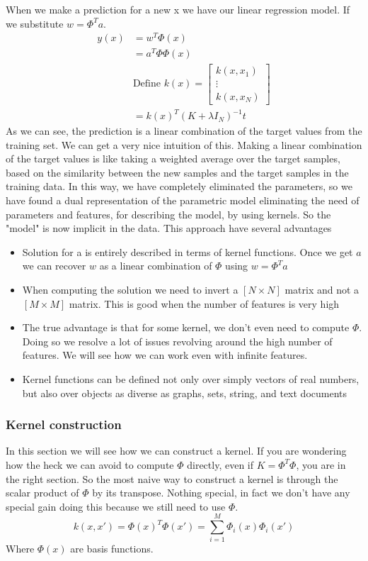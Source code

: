 \documentclass[../main.tex]{subfiles}
\begin{document}
When we make a prediction for a new x we have our linear regression model. If we substitute $w=\Phi^Ta$.
\begin{align*}
    y(x) & = w^T\Phi(x)                      \\
         & = a^T\Phi \Phi(x)                 \\
         & \text{Define }k(x)=
    \begin{bmatrix}
        k(x,x_1) \\
        \vdots   \\
        k(x,x_N)
    \end{bmatrix}                           \\
         & = k(x)^T (K + \lambda I_N)^{-1} t
\end{align*}
As we can see, the prediction is a linear combination of the target values from the training set. We can get a very nice intuition of this. Making a linear combination of the target values is like taking a weighted average over the target samples, based on the similarity between the new samples and the target samples in the training data. In this way, we have completely eliminated the parameters, so we have found a dual representation of the parametric model eliminating the need of parameters and features, for describing the model, by using kernels. So the "model" is now implicit in the data.
This approach have several advantages
\begin{itemize}
    \item Solution for a is entirely described in terms of kernel functions. Once we get $a$ we can recover $w$ as a linear combination of $\Phi$ using $w = \Phi^T a$
    \item When computing the solution we need to invert a $[N \times N]$ matrix and not a $[M \times M]$ matrix. This is good when the number of features is very high
    \item The true advantage is that for some kernel, we don't even need to compute $\Phi$. Doing so we resolve a lot of issues revolving around the high number of features. We will see how we can work even with infinite features.
    \item Kernel functions can be defined not only over simply vectors of real numbers, but also over objects as diverse as graphs, sets, string, and text documents
\end{itemize}

\subsubsection{Kernel construction}
In this section we will see how we can construct a kernel. If you are wondering how the heck we can avoid to compute $\Phi$ directly, even if $K=\Phi^T \Phi$, you are in the right section.
So the most naive way to construct a kernel is through the scalar product of $\Phi$ by its transpose. Nothing special, in fact we don't have any special gain doing this because we still need to use $\Phi$.
\begin{equation*}
    k(x,x') = \Phi(x)^T \Phi(x') = \sum_{i=1}^M \Phi_i(x) \Phi_i(x')
\end{equation*}
Where $\Phi(x)$ are basis functions.
\end{document}
